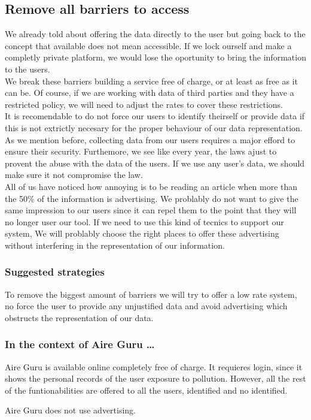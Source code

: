 \subsection{Remove all barriers to access}
We already told about offering the data directly to the user but going back to the concept that available
does not mean accessible. If we lock ourself and make a completly private platform, we would lose the oportunity
to bring the information to the users.\\

We break these barriers building a service free of charge, or at least as free as it can be. Of course, if we are 
working with data of third parties and they have a restricted policy, we will need to adjust the rates to cover
these restrictions.\\

It is recomendable to do not force our users to identify theirself or provide data if this is not
extrictly necesary for the proper behaviour of our data representation. As we mention before, collecting data from our
users requires a major efford to ensure their security. Furthemore, we see like every year, the laws ajust to provent
the abuse with the data of the users. If we use any user's data, we should make sure it not compromise the law.\\

All of us have noticed how annoying is to be reading an article when more than the 50\% of the information is advertising.
We problably do not want to give the same impression to our users since it can repel them to the point that they will no longer
user our tool. If we need to use this kind of tecnics to support our system, We will problably choose the right places to offer 
these advertising without interfering in the representation of our information.


\subsubsection*{Suggested strategies} 

To remove the biggest amount of barriers we will try to offer a low rate system, no force the user to provide any unjustified 
data and avoid advertising which obstructs the representation of our data.

\subsubsection*{In the context of Aire Guru \ldots} 

Aire Guru is available online completely free of charge. It requieres login, since it shows the personal records of the 
user exposure to pollution. However, all the rest of the funtionabilities are offered to all the users, identified and no 
identified.

Aire Guru does not use advertising.